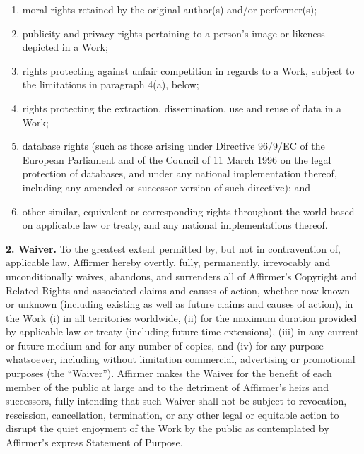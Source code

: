 {\begin{enumerate}[noitemsep,label=\roman*.]
    \item  moral rights retained by the original author(s) and/or
    performer(s);
    
    \item publicity and privacy rights pertaining to a person's
    image or likeness depicted in a Work;
    
    \item rights protecting against unfair competition in regards
    to a Work, subject to the limitations in paragraph 4(a),
    below;
    
    \item rights protecting the extraction, dissemination, use and
    reuse of data in a Work;
    
    \item database rights (such as those arising under Directive
    96/9/EC of the European Parliament and of the Council of 11
    March 1996 on the legal protection of databases, and under
    any national implementation thereof, including any amended
    or successor version of such directive); and
    
    \item other similar, equivalent or corresponding rights
    throughout the world based on applicable law or treaty, and
    any national implementations thereof.

  \end{enumerate}

  \noindent \textbf{2. Waiver.} To the greatest extent
  permitted by, but not in contravention of, applicable law,
  Affirmer hereby overtly, fully, permanently, irrevocably and
  unconditionally waives, abandons, and surrenders all of
  Affirmer's Copyright and Related Rights and associated claims
  and causes of action, whether now known or unknown (including
  existing as well as future claims and causes of action), in
  the Work (i) in all territories worldwide, (ii) for the
  maximum duration provided by applicable law or treaty
  (including future time extensions), (iii) in any current or
  future medium and for any number of copies, and (iv) for any
  purpose whatsoever, including without limitation commercial,
  advertising or promotional purposes (the ``Waiver''). Affirmer
  makes the Waiver for the benefit of each member of the public
  at large and to the detriment of Affirmer's heirs and
  successors, fully intending that such Waiver shall not be
  subject to revocation, rescission, cancellation, termination,
  or any other legal or equitable action to disrupt the quiet
  enjoyment of the Work by the public as contemplated by
  Affirmer's express Statement of Purpose.

}
